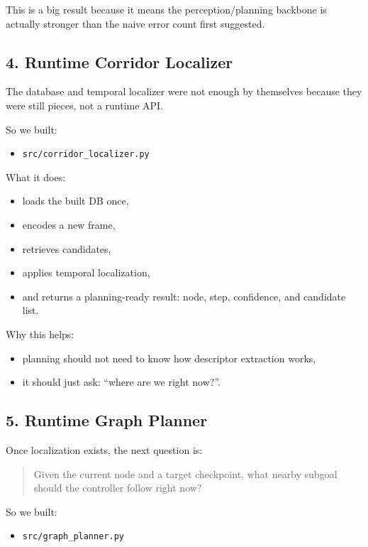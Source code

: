 \documentclass[11pt,a4paper]{article}
\begin{document}
This is a big result because it means the perception/planning backbone is
actually stronger than the naive error count first suggested.


\subsection{4. Runtime Corridor Localizer}

The database and temporal localizer were not enough by themselves because they
were still pieces, not a runtime API.

So we built:

\begin{itemize}[nosep]
  \item \texttt{src/corridor\_localizer.py}
\end{itemize}

What it does:

\begin{itemize}[nosep]
  \item loads the built DB once,
  \item encodes a new frame,
  \item retrieves candidates,
  \item applies temporal localization,
  \item and returns a planning-ready result:
        node, step, confidence, and candidate list.
\end{itemize}

Why this helps:

\begin{itemize}[nosep]
  \item planning should not need to know how descriptor extraction works,
  \item it should just ask: ``where are we right now?''.
\end{itemize}


\subsection{5. Runtime Graph Planner}

Once localization exists, the next question is:

\begin{quote}
Given the current node and a target checkpoint, what nearby subgoal should the
controller follow right now?
\end{quote}

So we built:

\begin{itemize}[nosep]
  \item \texttt{src/graph\_planner.py}
\end{itemize}
\end{document}
